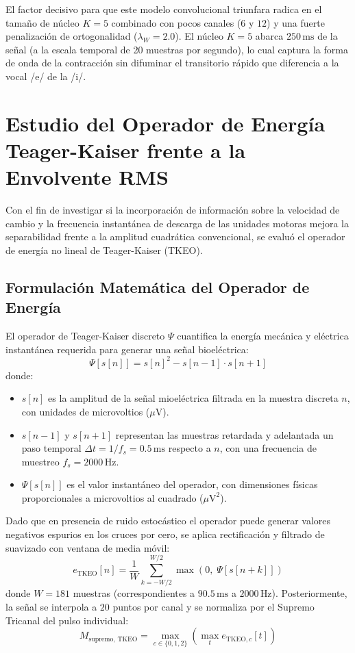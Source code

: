 \documentclass[11pt,a4paper]{article}
\begin{document}
El factor decisivo para que este modelo convolucional triunfara radica en el tamaño de núcleo $K=5$ combinado con pocos canales ($6$ y $12$) y una fuerte penalización de ortogonalidad ($\lambda_W = 2.0$). El núcleo $K=5$ abarca $250\,\text{ms}$ de la señal (a la escala temporal de 20 muestras por segundo), lo cual captura la forma de onda de la contracción sin difuminar el transitorio rápido que diferencia a la vocal /e/ de la /i/.

\section{Estudio del Operador de Energía Teager-Kaiser frente a la Envolvente RMS}
\label{sec:estudio_tkeo}

Con el fin de investigar si la incorporación de información sobre la velocidad de cambio y la frecuencia instantánea de descarga de las unidades motoras mejora la separabilidad frente a la amplitud cuadrática convencional, se evaluó el operador de energía no lineal de Teager-Kaiser (TKEO).

\subsection{Formulación Matemática del Operador de Energía}
\label{subsec:form_tkeo}

El operador de Teager-Kaiser discreto $\Psi$ cuantifica la energía mecánica y eléctrica instantánea requerida para generar una señal bioeléctrica:
\begin{equation}
    \Psi[s[n]] = s[n]^2 - s[n-1] \cdot s[n+1]
\end{equation}
donde:
\begin{itemize}
    \item $s[n]$ es la amplitud de la señal mioeléctrica filtrada en la muestra discreta $n$, con unidades de microvoltios ($\mu\text{V}$).
    \item $s[n-1]$ y $s[n+1]$ representan las muestras retardada y adelantada un paso temporal $\Delta t = 1/f_s = 0.5\,\text{ms}$ respecto a $n$, con una frecuencia de muestreo $f_s = 2000\,\text{Hz}$.
    \item $\Psi[s[n]]$ es el valor instantáneo del operador, con dimensiones físicas proporcionales a microvoltios al cuadrado ($\mu\text{V}^2$).
\end{itemize}

Dado que en presencia de ruido estocástico el operador puede generar valores negativos espurios en los cruces por cero, se aplica rectificación y filtrado de suavizado con ventana de media móvil:
\begin{equation}
    e_{\text{TKEO}}[n] = \frac{1}{W} \sum_{k=-W/2}^{W/2} \max(0, \; \Psi[s[n+k]])
\end{equation}
donde $W = 181$ muestras (correspondientes a $90.5\,\text{ms}$ a $2000\,\text{Hz}$). Posteriormente, la señal se interpola a $20$ puntos por canal y se normaliza por el Supremo Tricanal del pulso individual:
\begin{equation}
    M_{\text{supremo, TKEO}} = \max_{c \in \{0, 1, 2\}} \left( \max_{t} e_{\text{TKEO}, c}[t] \right)
\end{equation}
\end{document}
